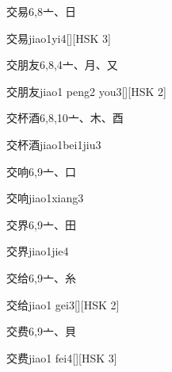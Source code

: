 \begin{Entry}{交易}{6,8}{⼇、⽇}
  \begin{Phonetics}{交易}{jiao1yi4}[][HSK 3]
  \end{Phonetics}
\end{Entry}

\begin{Entry}{交朋友}{6,8,4}{⼇、⽉、⼜}
  \begin{Phonetics}{交朋友}{jiao1 peng2 you3}[][HSK 2]
  \end{Phonetics}
\end{Entry}

\begin{Entry}{交杯酒}{6,8,10}{⼇、⽊、⾣}
  \begin{Phonetics}{交杯酒}{jiao1bei1jiu3}
  \end{Phonetics}
\end{Entry}

\begin{Entry}{交响}{6,9}{⼇、⼝}
  \begin{Phonetics}{交响}{jiao1xiang3}
  \end{Phonetics}
\end{Entry}

\begin{Entry}{交界}{6,9}{⼇、⽥}
  \begin{Phonetics}{交界}{jiao1jie4}
  \end{Phonetics}
\end{Entry}

\begin{Entry}{交给}{6,9}{⼇、⽷}
  \begin{Phonetics}{交给}{jiao1 gei3}[][HSK 2]
  \end{Phonetics}
\end{Entry}

\begin{Entry}{交费}{6,9}{⼇、⾙}
  \begin{Phonetics}{交费}{jiao1 fei4}[][HSK 3]
  \end{Phonetics}
\end{Entry}

